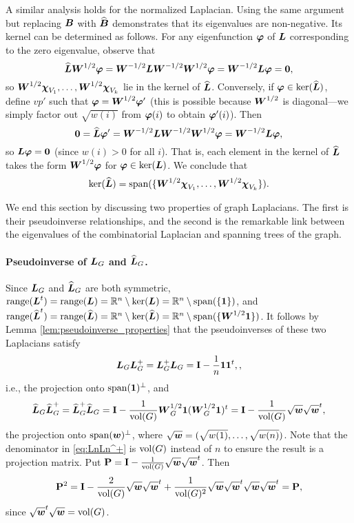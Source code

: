 A similar analysis holds for the normalized Laplacian. Using the same argument but replacing $\vb*{B}$ with $\widehat{\vb*{B}}$ demonstrates that its eigenvalues are non-negative. Its kernel can be determined as follows. For any eigenfunction $\vb*{\varphi}$ of $\vb*{L}$ corresponding to the zero eigenvalue, observe that 
\[\widehat{\vb*{L}}\vb*{W}^{1/2}\vb*{\varphi} = \vb*{W}^{-1/2}\vb*{L}\vb*{W}^{-1/2}\vb*{W}^{1/2}\vb*{\varphi} = \vb*{W}^{-1/2}\vb*{L}\vb*{\varphi} = \vb{0},\]
so $\vb*{W}^{1/2}\boldsymbol{\chi}_{V_1},\dots,\vb*{W}^{1/2}\boldsymbol{\chi}_{V_k}$ lie in the kernel of $\widehat{\vb*{L}}$.
Conversely, if $\vb*{\varphi}\in\ker(\widehat{\vb*{L}})$, define $vp'$ such that $\vb*{\varphi}=\vb*{W}^{1/2}\vb*{\varphi}'$ (this is possible because $\vb*{W}^{1/2}$ is diagonal---we simply factor out $\sqrt{w(i)}$ from $\vb*{\varphi}(i)$ to obtain $\vb*{\varphi}'(i)$). Then 
\[\vb{0} =\widehat{\vb*{L}}\vb*{\varphi}' = \vb*{W}^{-1/2}\vb*{L} \vb*{W}^{-1/2}\vb*{W}^{1/2}\vb*{\varphi} = \vb*{W}^{-1/2}\vb*{L}\vb*{\varphi},\]
so $\vb*{L}\vb*{\varphi}=\vb{0}$ (since $w(i)>0$ for all $i$). That is, each element in the kernel of $\widehat{\vb*{L}}$ takes the form $\vb*{W}^{1/2}\vb*{\varphi}$ for $\vb*{\varphi}\in\ker(\vb*{L})$. We conclude that 
\[\ker(\widehat{\vb*{L}})=\textnormal{span}(\{\vb*{W}^{1/2}\boldsymbol{\chi}_{V_1},\dots,\vb*{W}^{1/2}\boldsymbol{\chi}_{V_k}\}).\]

We  end this section by discussing two properties of graph Laplacians. The first is  their pseudoinverse relationships, and the second is the remarkable link between the eigenvalues of the combinatorial  Laplacian and spanning trees of the graph. 

\paragraph{Pseudoinverse of \texorpdfstring{$\vb*{L}_G$}{the combinatorial} and \texorpdfstring{$\widehat{\vb*{L}}_G$}{normalized Laplacian}.}
Since $\vb*{L}_G$ and $\widehat{\vb*{L}}_G$ are both symmetric, $\textnormal{range}(\vb*{L}^t)=\textnormal{range}(\vb*{L})=\mathbb{R}^n \setminus \ker(\vb*{L})=\mathbb{R}^n \setminus \textnormal{span}(\{\vb{1}\})$, and $\textnormal{range}(\widehat{\vb*{L}}^t)=\textnormal{range}(\widehat{\vb*{L}})=\mathbb{R}^n \setminus \ker(\widehat{\vb*{L}})=\mathbb{R}^n \setminus \textnormal{span}(\{\vb*{W}^{1/2}\vb{1}\})$. It follows by Lemma \ref{lem:pseudoinverse_properties} that the pseudoinverses of these two Laplacians satisfy
\begin{equation}
\label{eq:LL^+}
\vb*{L}_G\vb*{L}_G^+ = \vb*{L}_G^+\vb*{L}_G = \vb{I} - \frac{1}{n}\vb{1}\vb{1}^t,,
\end{equation}
i.e., the projection onto $\textnormal{span}(\vb{1})^\perp$, and 
\begin{equation}
\label{eq:LnLn^+}
\widehat{\vb*{L}}_G\widehat{\vb*{L}}_G^+ = \widehat{\vb*{L}}_G^+\widehat{\vb*{L}}_G = \vb{I} - \frac{1}{\textnormal{vol}(G)}\vb*{W}_G^{1/2}\vb{1}(\vb*{W}_G^{1/2}\vb{1})^t = \vb{I}-\frac{1}{\textnormal{vol}(G)}\sqrt{\vb*{w}}\sqrt{\vb*{w}}^t,
\end{equation}
the projection onto $\textnormal{span}(\vb*{w})^\perp$, where $\sqrt{\vb*{w}}=(\sqrt{w(1)},\dots,\sqrt{w(n)})$. Note that the denominator in \eqref{eq:LnLn^+} is $\textnormal{vol}(G)$ instead of $n$ to ensure the result is a projection matrix. Put $\vb{P} = \vb{I}-\frac{1}{\textnormal{vol}(G)}\sqrt{\vb*{w}}\sqrt{\vb*{w}}^t$. Then 
\begin{align*}
\vb{P}^2 = \vb{I} - \frac{2}{\textnormal{vol}(G)}\sqrt{\vb*{w}}\sqrt{\vb*{w}}^t + \frac{1}{\textnormal{vol}(G)^2}\sqrt{\vb*{w}}\sqrt{\vb*{w}}^t\sqrt{\vb*{w}}\sqrt{\vb*{w}}^t = \vb{P},
\end{align*}
since $\sqrt{\vb*{w}}^t\sqrt{\vb*{w}}= \textnormal{vol}(G)$. 



